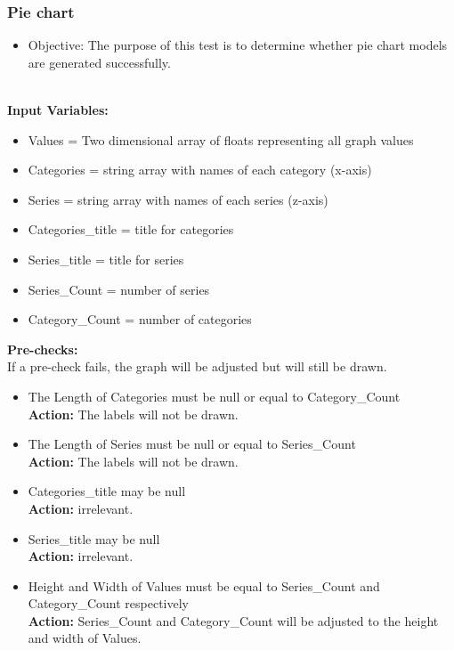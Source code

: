 \documentclass[a4paper,12pt]{article}
\begin{document}
\subsubsection{Pie chart}
\begin{itemize}
	\item Objective: The purpose of this test is to determine whether pie chart models are generated successfully. \\\
\end{itemize} 

\textbf{Input Variables: }
		\begin{itemize}
			\item Values = Two dimensional array of floats representing all graph values
			\item Categories = string array with names of each category (x-axis)
			\item Series = string array with names of each series (z-axis)
			\item Categories\_title = title for categories
			\item Series\_title = title for series
			\item Series\_Count = number of series
			\item Category\_Count = number of categories
		\end{itemize}
\textbf{Pre-checks:}\\
If a pre-check fails, the graph will be adjusted but will still be drawn.

	\begin{itemize}
		\item The Length of Categories must be null or equal to Category\_Count \\
		\textbf{Action:} The labels will not be drawn.
		\item The Length of Series must be null or equal to Series\_Count \\
		\textbf{Action:} The labels will not be drawn.
		\item Categories\_title may be null\\
		\textbf{Action:} irrelevant. 
		\item Series\_title may be null\\
		\textbf{Action:} irrelevant. 
		\item Height and Width of Values must be equal to Series\_Count and Category\_Count respectively\\
		\textbf{Action:} Series\_Count and Category\_Count will be adjusted to the height and width of Values.
	\end{itemize}
	
\end{document}
